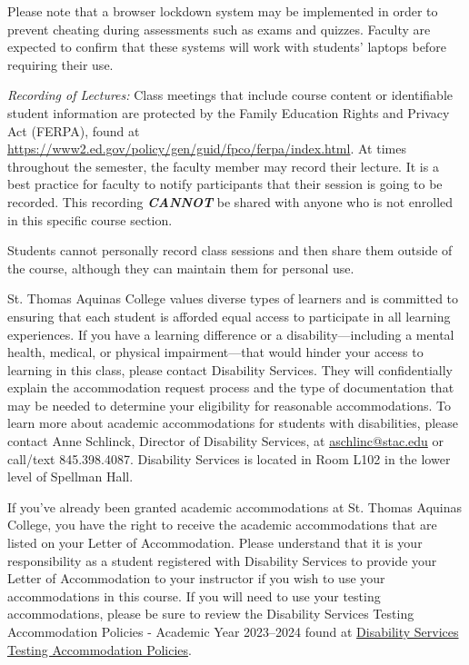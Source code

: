\documentclass[11pt,letterpaper]{article}
\begin{document}
Please note that a browser lockdown system may be implemented in order to prevent cheating during assessments such as exams and quizzes. Faculty are expected to confirm that these systems will work with students' laptops before requiring their use. \pspace

{\itshape Recording of Lectures:} Class meetings that include course content or identifiable student information are protected by the Family Education Rights and Privacy Act (FERPA), found at \url{https://www2.ed.gov/policy/gen/guid/fpco/ferpa/index.html}. At times throughout the semester, the faculty member may record their lecture. It is a best practice for faculty to notify participants that their session is going to be recorded. This recording \textit{\textbf{CANNOT}} be shared with anyone who is not enrolled in this specific course section. \pspace

Students cannot personally record class sessions and then share them outside of the course, although they can maintain them for personal use. \pspace





\newpage






St. Thomas Aquinas College values diverse types of learners and is committed to ensuring that each student is afforded equal access to participate in all learning experiences. If you have a learning difference or a disability---including a mental health, medical, or physical impairment---that would hinder your access to learning in this class, please contact Disability Services. They will confidentially explain the accommodation request process and the type of documentation that may be needed to determine your eligibility for reasonable accommodations. To learn more about academic accommodations for students with disabilities, please contact Anne Schlinck, Director of Disability Services, at \href{mailto:aschlinc@stac.edu}{aschlinc@stac.edu} or call/text 845.398.4087. Disability Services is located in Room L102 in the lower level of Spellman Hall. \pspace

If you've already been granted academic accommodations at St. Thomas Aquinas College, you have the right to receive the academic accommodations that are listed on your Letter of Accommodation. Please understand that it is your responsibility as a student registered with Disability Services to provide your Letter of Accommodation to your instructor if you wish to use your accommodations in this course. If you will need to use your testing accommodations, please be sure to review the Disability Services Testing Accommodation Policies - Academic Year 2023--2024 found at \href{https://docs.google.com/document/d/1V5iUtgypiS8kClqhSLPde7AOSZPoLu6CsIDcpiEic2w/edit?usp=sharing}{Disability Services Testing Accommodation Policies}. \sectionbreak
\end{document}
